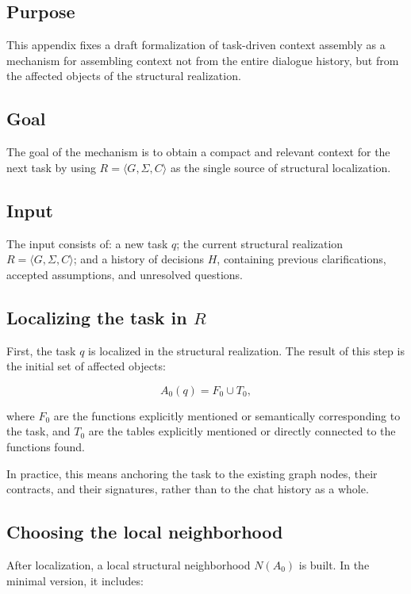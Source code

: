 \subsection{Purpose}

This appendix fixes a draft formalization of task-driven context assembly as a mechanism for assembling context not from the entire dialogue history, but from the affected objects of the structural realization.

\subsection{Goal}

The goal of the mechanism is to obtain a compact and relevant context for the next task by using $R = \langle G, \Sigma, C \rangle$ as the single source of structural localization.

\subsection{Input}

The input consists of: a new task $q$; the current structural realization $R = \langle G, \Sigma, C \rangle$; and a history of decisions $H$, containing previous clarifications, accepted assumptions, and unresolved questions.

\subsection{Localizing the task in $R$}

First, the task $q$ is localized in the structural realization. The result of this step is the initial set of affected objects:


$$A_0(q) = F_0 \cup T_0,$$

where $F_0$ are the functions explicitly mentioned or semantically corresponding to the task, and $T_0$ are the tables explicitly mentioned or directly connected to the functions found.

In practice, this means anchoring the task to the existing graph nodes, their contracts, and their signatures, rather than to the chat history as a whole.

\subsection{Choosing the local neighborhood}

After localization, a local structural neighborhood $N(A_0)$ is built. In the minimal version, it includes:

